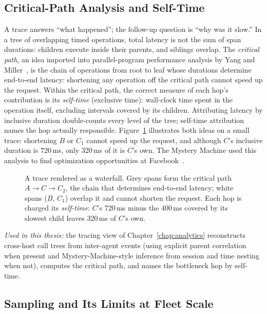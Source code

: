 \subsection{Critical-Path Analysis and Self-Time}
\label{sec:bg-critpath}

A trace answers ``what happened''; the follow-up question is ``why was it
slow.'' In a tree of overlapping timed operations, total latency is not the
sum of span durations: children execute inside their parents, and siblings
overlap. The \emph{critical path}, an idea imported into parallel-program
performance analysis by Yang and Miller~\cite{yang1988critpath}, is the
chain of operations from root to
leaf whose durations determine end-to-end latency: shortening any
operation off the critical path cannot speed up the request. Within the
critical path, the correct measure of each hop's contribution is its
\emph{self-time} (exclusive time): wall-clock time spent in the operation
itself, excluding intervals covered by its children. Attributing latency by
inclusive duration double-counts every level of the tree; self-time
attribution names the hop actually responsible. Figure~\ref{fig:critpath}
illustrates both ideas on a small trace: shortening $B$ or $C_1$ cannot
speed up the request, and although $C$'s inclusive duration is 720\,ms,
only 320\,ms of it is $C$'s own.
The Mystery Machine used this analysis to find optimization
opportunities at Facebook~\cite{chow2014mystery}.

\begin{figure}[t]
  \centering
  
  \caption[A trace waterfall: critical path and self-time]{A trace rendered as a waterfall. Grey spans form the critical
  path $A \rightarrow C \rightarrow C_2$, the chain that determines
  end-to-end latency; white spans ($B$, $C_1$) overlap it and cannot
  shorten the request. Each hop is charged its \emph{self-time}: $C$'s
  720\,ms minus the 400\,ms covered by its slowest child leaves 320\,ms
  of $C$'s own.}
  \label{fig:critpath}
\end{figure}

\emph{Used in this thesis:} the tracing view of Chapter~\ref{chap:analytics}
reconstructs cross-host call trees from inter-agent events (using explicit
parent correlation when present and Mystery-Machine-style inference from
session and time nesting when not), computes the critical path, and names
the bottleneck hop by self-time.

\subsection{Sampling and Its Limits at Fleet Scale}
\label{sec:bg-sampling}

